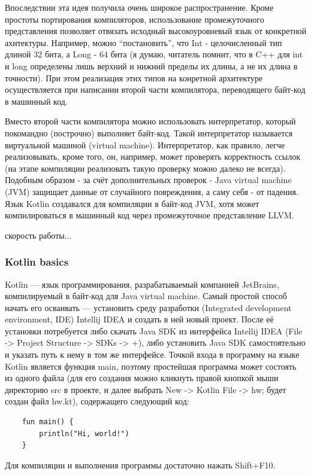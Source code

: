 \documentclass{book}
\begin{document}
Впоследствии эта идея получила очень широкое распространение. Кроме простоты портирования
компиляторов, использование промежуточного представления позволяет отвязать исходный
высокоуровневый язык от конкретной ахитектуры. Например, можно ``постановить'', что Int -
целочисленный тип длиной 32 бита, а Long - 64 бита (я думаю, читатель помнит, что в C++ для int и
long определены лишь верхний и нижний пределы их длины, а не их длина в точности). При этом
реализация этих типов на конретной архитектуре осуществляется при написании второй части
компилятора, переводящего байт-код в машинный код.

Вместо второй части компилятора можно использовать интерпретатор, который покомандно (построчно)
выполняет байт-код. Такой интерпретатор называется виртуальной машиной (virtual machine).
Интерпретатор, как правило, легче реализовывать, кроме того, он, например, может проверять
корректность ссылок (на этапе компиляции реализовать такую проверку можно далеко не всегда).
Подобным образом - за счёт дополнительных проверок - Java virtual machine (JVM) защищает данные от
случайного повреждения, а саму себя - от падения. Язык Kotlin создавался для компиляции в байт-код
JVM, хотя может компилироваться в машинный код через промежуточное представление LLVM.

скорость работы...

\subsubsection{Kotlin basics}

Kotlin --- язык программирования, разрабатываемый компанией JetBrains, компилируемый в байт-код для
Java virtual machine. Самый простой способ начать его осваивать --- установить среду разработки
(Integrated development environment, IDE) Intellij IDEA и создать в ней новый проект. После её установки потребуется либо
скачать Java SDK из интерфейса Intellij IDEA (File -> Project Structure -> SDKs -> +), либо
установить Java SDK самостоятельно и указать путь к нему в том же интерфейсе. Точкой входа в
программу на языке Kotlin является функция main, поэтому простейшая программа может состоять из
одного файла (для его создания можно кликнуть правой кнопкой мыши директорию src в проекте, и далее
выбрать New -> Kotlin File -> hw; будет создан файл hw.kt), содержащего следующий код:
\begin{verbatim}
    fun main() {
        println("Hi, world!")
    }
\end{verbatim}
Для компиляции и выполнения программы достаточно нажать Shift+F10.
\end{document}
